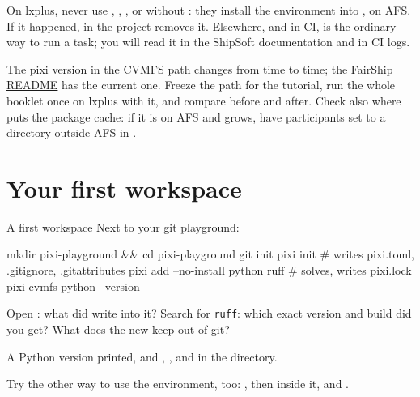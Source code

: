 \begin{pitfall}
On lxplus, never use , , ,
or  without : they install the environment
into , on AFS. If it happened,  in the project
removes it. Elsewhere, and in CI,  is the ordinary way
to run a task; you will read it in the ShipSoft documentation and in CI logs.
\end{pitfall}

\begin{organisernote}
The pixi version in the CVMFS path changes from time to time; the
\href{https://github.com/ShipSoft/FairShip\#on-lxplus-afs}{FairShip README}
has the current one. Freeze the path for the tutorial, run the whole booklet
once on lxplus with it, and compare  before and after. Check
also where  puts the package cache: if it is on AFS and grows,
have participants set  to a directory outside AFS in
.
\end{organisernote}

\section{Your first workspace}

\begin{exercise}{A first workspace}
\label{ex:pixifirst}
Next to your git playground:
\begin{shell}
mkdir pixi-playground && cd pixi-playground
git init
pixi init                # writes pixi.toml, .gitignore, .gitattributes
pixi add --no-install python ruff    # solves, writes pixi.lock
pixi cvmfs python --version
\end{shell}
Open : what did  write into it? Search
 for \texttt{ruff}: which exact version and build did you get?
What does the new  keep out of git?
\end{exercise}

\begin{checkpoint}
A Python version printed, and , ,
 and  in the directory.
\end{checkpoint}

Try the other way to use the environment, too: , then
 inside it, and .

